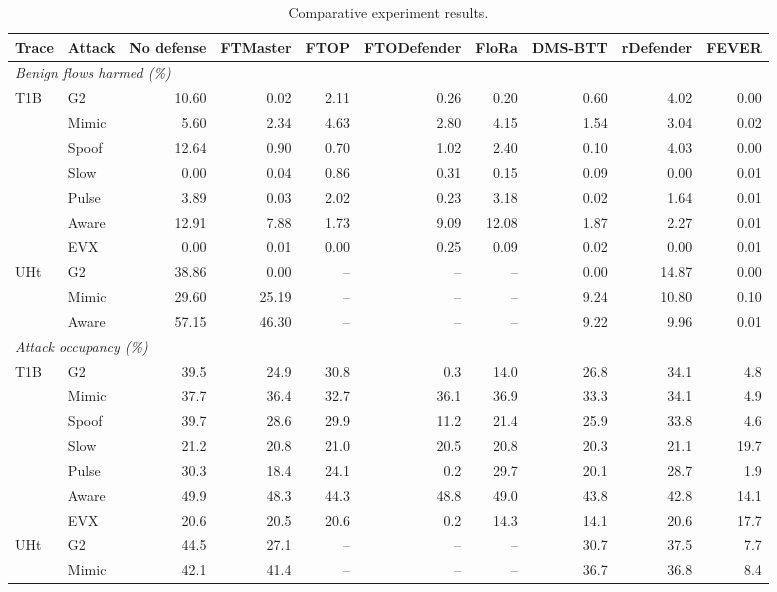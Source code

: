 \begin{table}[t]
\centering
\caption{Comparative experiment results.}
\label{tab:main}
\small
\setlength{\tabcolsep}{4pt}
\begin{tabular}{llrrrrrrrr}
\toprule
Trace & Attack & No defense & FTMaster & FTOP & FTODefender & FloRa & DMS-BTT & rDefender & FEVER \\
\midrule
\multicolumn{10}{l}{\textit{Benign flows harmed (\%)}} \\
\midrule
T1B & G2 & 10.60 & 0.02 & 2.11 & 0.26 & 0.20 & 0.60 & 4.02 & 0.00 \\
 & Mimic & 5.60 & 2.34 & 4.63 & 2.80 & 4.15 & 1.54 & 3.04 & 0.02 \\
 & Spoof & 12.64 & 0.90 & 0.70 & 1.02 & 2.40 & 0.10 & 4.03 & 0.00 \\
 & Slow & 0.00 & 0.04 & 0.86 & 0.31 & 0.15 & 0.09 & 0.00 & 0.01 \\
 & Pulse & 3.89 & 0.03 & 2.02 & 0.23 & 3.18 & 0.02 & 1.64 & 0.01 \\
 & Aware & 12.91 & 7.88 & 1.73 & 9.09 & 12.08 & 1.87 & 2.27 & 0.01 \\
 & EVX & 0.00 & 0.01 & 0.00 & 0.25 & 0.09 & 0.02 & 0.00 & 0.01 \\
UHt & G2 & 38.86 & 0.00 & -- & -- & -- & 0.00 & 14.87 & 0.00 \\
 & Mimic & 29.60 & 25.19 & -- & -- & -- & 9.24 & 10.80 & 0.10 \\
 & Aware & 57.15 & 46.30 & -- & -- & -- & 9.22 & 9.96 & 0.01 \\
\midrule
\multicolumn{10}{l}{\textit{Attack occupancy (\%)}} \\
\midrule
T1B & G2 & 39.5 & 24.9 & 30.8 & 0.3 & 14.0 & 26.8 & 34.1 & 4.8 \\
 & Mimic & 37.7 & 36.4 & 32.7 & 36.1 & 36.9 & 33.3 & 34.1 & 4.9 \\
 & Spoof & 39.7 & 28.6 & 29.9 & 11.2 & 21.4 & 25.9 & 33.8 & 4.6 \\
 & Slow & 21.2 & 20.8 & 21.0 & 20.5 & 20.8 & 20.3 & 21.1 & 19.7 \\
 & Pulse & 30.3 & 18.4 & 24.1 & 0.2 & 29.7 & 20.1 & 28.7 & 1.9 \\
 & Aware & 49.9 & 48.3 & 44.3 & 48.8 & 49.0 & 43.8 & 42.8 & 14.1 \\
 & EVX & 20.6 & 20.5 & 20.6 & 0.2 & 14.3 & 14.1 & 20.6 & 17.7 \\
UHt & G2 & 44.5 & 27.1 & -- & -- & -- & 30.7 & 37.5 & 7.7 \\
 & Mimic & 42.1 & 41.4 & -- & -- & -- & 36.7 & 36.8 & 8.4 \\

\end{tabular}
\end{table}
